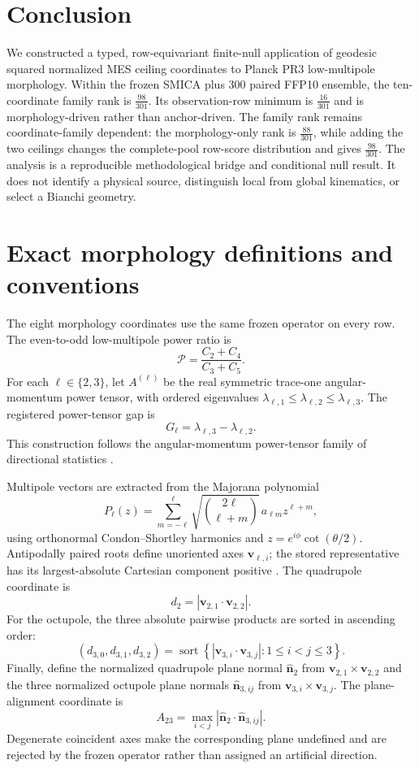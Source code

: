 \documentclass[11pt]{article}
\begin{document}
\section{Conclusion}
We constructed a typed, row-equivariant finite-null application of geodesic squared normalized MES ceiling coordinates to Planck PR3 low-multipole morphology. Within the frozen SMICA plus 300 paired FFP10 ensemble, the ten-coordinate family rank is $\frac{98}{301}$. Its observation-row minimum is $\frac{16}{301}$ and is morphology-driven rather than anchor-driven. The family rank remains coordinate-family dependent: the morphology-only rank is $\frac{88}{301}$, while adding the two ceilings changes the complete-pool row-score distribution and gives $\frac{98}{301}$. The analysis is a reproducible methodological bridge and conditional null result. It does not identify a physical source, distinguish local from global kinematics, or select a Bianchi geometry.

\appendix
\section{Exact morphology definitions and conventions}
The eight morphology coordinates use the same frozen operator on every row. The even-to-odd low-multipole power ratio is
\[
\mathcal P=\frac{C_2+C_4}{C_3+C_5}.
\]
For each $\ell\in\{2,3\}$, let $A^{(\ell)}$ be the real symmetric trace-one angular-momentum power tensor, with ordered eigenvalues $\lambda_{\ell,1}\leq\lambda_{\ell,2}\leq\lambda_{\ell,3}$. The registered power-tensor gap is
\[
G_\ell=\lambda_{\ell,3}-\lambda_{\ell,2}.
\]
This construction follows the angular-momentum power-tensor family of directional statistics \cite{AluriRalstonWeltman2017}.

Multipole vectors are extracted from the Majorana polynomial
\[
P_\ell(z)=\sum_{m=-\ell}^\ell
\sqrt{\binom{2\ell}{\ell+m}}\,a_{\ell m}z^{\ell+m},
\]
using orthonormal Condon--Shortley harmonics and $z=e^{i\phi}\cot(\theta/2)$. Antipodally paired roots define unoriented axes $\boldsymbol v_{\ell,i}$; the stored representative has its largest-absolute Cartesian component positive \cite{CopiHutererStarkman2004,Weeks2004}. The quadrupole coordinate is
\[
d_2=\left|\boldsymbol v_{2,1}\!\cdot\!\boldsymbol v_{2,2}\right|.
\]
For the octupole, the three absolute pairwise products are sorted in ascending order:
\[
(d_{3,0},d_{3,1},d_{3,2})
=\operatorname{sort}\left\{
\left|\boldsymbol v_{3,i}\!\cdot\!\boldsymbol v_{3,j}\right|:
1\leq i<j\leq3
\right\}.
\]
Finally, define the normalized quadrupole plane normal $\widehat{\boldsymbol n}_2$ from $\boldsymbol v_{2,1}\times\boldsymbol v_{2,2}$ and the three normalized octupole plane normals $\widehat{\boldsymbol n}_{3,ij}$ from $\boldsymbol v_{3,i}\times\boldsymbol v_{3,j}$. The plane-alignment coordinate is
\[
A_{23}=\max_{i<j}
\left|\widehat{\boldsymbol n}_2\!\cdot\!\widehat{\boldsymbol n}_{3,ij}\right|.
\]
Degenerate coincident axes make the corresponding plane undefined and are rejected by the frozen operator rather than assigned an artificial direction.
\end{document}
